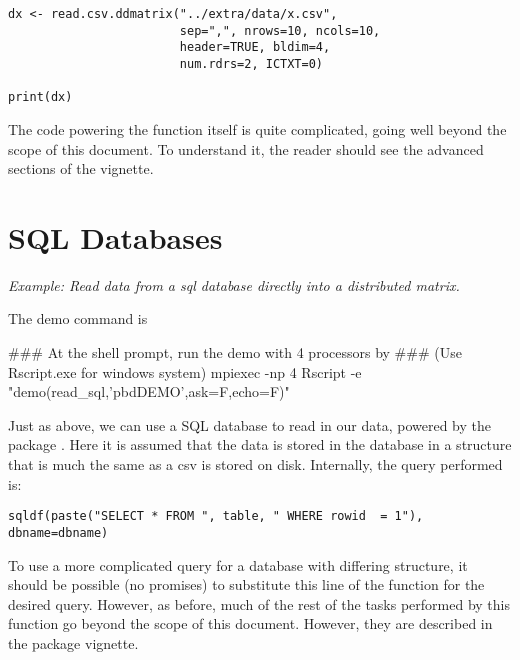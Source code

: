 \begin{lstlisting}[language=rr,title=Reading a CSV with Multiple Readers]
dx <- read.csv.ddmatrix("../extra/data/x.csv", 
                        sep=",", nrows=10, ncols=10, 
                        header=TRUE, bldim=4, 
                        num.rdrs=2, ICTXT=0)

print(dx)
\end{lstlisting}

The code powering the function itself is quite complicated, going well beyond the scope of this document.  To understand it, the reader should see the advanced sections of the  vignette.

\section{SQL Databases}
\label{sec:sql_db}

\emph{Example:  Read data from a sql database directly into a distributed matrix.}

The demo command is
\begin{Command}
### At the shell prompt, run the demo with 4 processors by
### (Use Rscript.exe for windows system)
mpiexec -np 4 Rscript -e "demo(read_sql,'pbdDEMO',ask=F,echo=F)"
\end{Command}

Just as above, we can use a SQL database to read in our data, powered by the  package \citep{sqldf}.  Here it is assumed that the data is stored in the database in a structure that is much the same as a csv is stored on disk.  Internally, the query performed is:

\begin{lstlisting}[language=rr]
sqldf(paste("SELECT * FROM ", table, " WHERE rowid  = 1"), dbname=dbname)
\end{lstlisting}

To use a more complicated query for a database with differing structure, it should be possible (no promises) to substitute this line of the  function for the desired query.  However, as before, much of the rest of the tasks performed by this function go beyond the scope of this document.  However, they are described in the  package vignette.